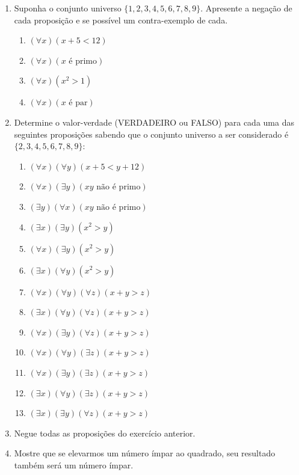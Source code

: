 \documentclass[oneside,a4paper,12pt]{article}
\begin{document}
\begin{enumerate}
	\item Suponha o conjunto universo $\{1,2,3,4,5,6,7,8,9\}$. Apresente a negação de cada proposição e se possível um contra-exemplo de cada.
	\begin{enumerate}
		\item $(\forall x)(x+5<12)$
		\item $(\forall x)(x \text{ é primo})$
		\item $(\forall x)(x^2 > 1)$
		\item $(\forall x)(x \text{ é par})$
	\end{enumerate}
	
	\item Determine o valor-verdade (VERDADEIRO ou FALSO) para cada uma das seguintes proposições sabendo que o conjunto universo a ser considerado é $\{2,3,4,5,6,7,8,9\}$:
	\begin{multicols}{2}
	\begin{enumerate}
		\item $ (\forall x)(\forall y)(x+5 < y + 12)$
		\item $ (\forall x)(\exists y)(xy \text{ não é primo})$
		\item $ (\exists y)(\forall x)(xy \text{ não é primo})$
		\item $ (\exists x)(\exists y)(x^2>y)$
		\item $ (\forall x)(\exists y)(x^2>y)$
		\item $ (\exists x)(\forall y)(x^2>y)$
		\item $ (\forall x)(\forall y)(\forall z)(x+y>z)$
		\item $ (\exists x)(\forall y)(\forall z)(x+y>z)$
		\item $ (\forall x)(\exists y)(\forall z)(x+y>z)$
		\item $ (\forall x)(\forall y)(\exists z)(x+y>z)$
		\item $ (\forall x)(\exists y)(\exists z)(x+y>z)$
		\item $ (\exists x)(\forall y)(\exists z)(x+y>z)$
		\item $ (\exists x)(\exists y)(\forall z)(x+y>z)$
	\end{enumerate}
	\end{multicols}

	\item Negue todas as proposições do exercício anterior.

	\item Mostre que se elevarmos um número ímpar ao quadrado, seu resultado também será um número ímpar.


\end{enumerate}
\end{document}
